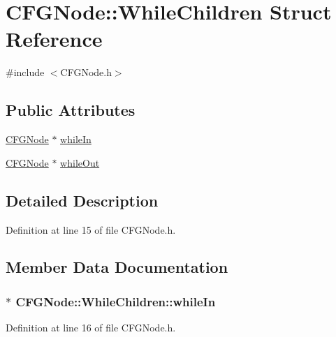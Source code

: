 \hypertarget{struct_c_f_g_node_1_1_while_children}{\section{C\-F\-G\-Node\-:\-:While\-Children Struct Reference}
\label{struct_c_f_g_node_1_1_while_children}
}


{\ttfamily \#include $<$C\-F\-G\-Node.\-h$>$}

\subsection*{Public Attributes}
\begin{DoxyCompactItemize}
\item 
\hyperlink{class_c_f_g_node}{C\-F\-G\-Node} $\ast$ \hyperlink{struct_c_f_g_node_1_1_while_children_a1a36726d99a6ce15a928527d23fce4f5}{while\-In}
\item 
\hyperlink{class_c_f_g_node}{C\-F\-G\-Node} $\ast$ \hyperlink{struct_c_f_g_node_1_1_while_children_aa7eacf6afada7bab8a07c677fc5466d5}{while\-Out}
\end{DoxyCompactItemize}


\subsection{Detailed Description}


Definition at line 15 of file C\-F\-G\-Node.\-h.



\subsection{Member Data Documentation}
\hypertarget{struct_c_f_g_node_1_1_while_children_a1a36726d99a6ce15a928527d23fce4f5}{
\subsubsection[{while\-In}]{$\ast$ C\-F\-G\-Node\-::\-While\-Children\-::while\-In}}\label{struct_c_f_g_node_1_1_while_children_a1a36726d99a6ce15a928527d23fce4f5}


Definition at line 16 of file C\-F\-G\-Node.\-h.

